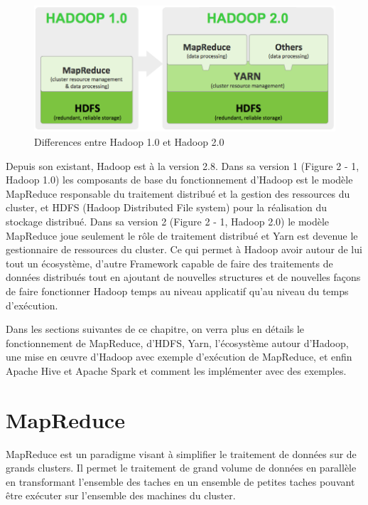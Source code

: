 \documentclass[12pt,french]{book}
\begin{document}
	\newpage
	\begin{figure}[t]
		\centering
		\includegraphics[width=\linewidth]{hadoop1vshadoop2}
		\caption[Differences entre Hadoop 1.0 et Hadoop 2.0]{Differences entre Hadoop 1.0 et Hadoop 2.0\footnotemark}
	\end{figure}


Depuis son existant, Hadoop est à la version 2.8.
Dans sa version 1 (Figure 2 - 1, Hadoop 1.0) les composants de base du fonctionnement d’Hadoop est le modèle MapReduce responsable du traitement distribué et la gestion des ressources du cluster, et HDFS (Hadoop Distributed File system) pour la réalisation du stockage distribué.
Dans sa version 2 (Figure 2 - 1, Hadoop 2.0) le modèle MapReduce joue seulement le rôle de traitement distribué et Yarn est devenue le gestionnaire de ressources du cluster.
Ce qui permet à Hadoop avoir autour de lui tout un écosystème, d’autre Framework capable de faire des traitements de données distribués tout en ajoutant de nouvelles structures et de nouvelles façons de faire fonctionner Hadoop temps au niveau applicatif qu’au niveau du temps d’exécution.

Dans les sections suivantes de ce chapitre, on verra plus en détails le fonctionnement de MapReduce, d’HDFS, Yarn, l’écosystème autour d’Hadoop, une mise en œuvre d’Hadoop avec exemple d’exécution de MapReduce, et enfin Apache Hive et Apache Spark et comment les implémenter avec des exemples.

	\section{MapReduce}
MapReduce est un paradigme visant à simplifier le traitement de données sur de grands clusters. Il permet le traitement de grand volume de données en parallèle en transformant l’ensemble des taches en un ensemble de petites taches pouvant être exécuter sur l’ensemble des machines du cluster. 
\end{document}
